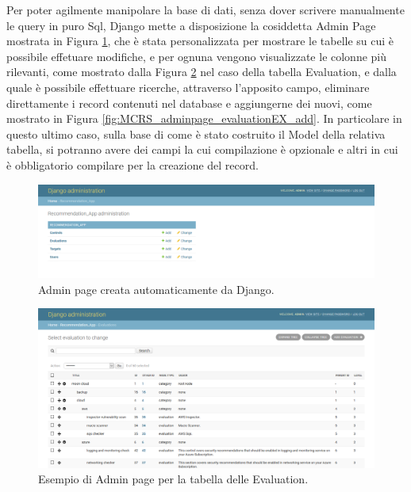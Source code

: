 %
Per poter agilmente manipolare la base di dati, senza dover scrivere manualmente le query in puro Sql, Django mette a disposizione 
la cosiddetta Admin Page mostrata in Figura \ref{fig:MCRS_adminpage}, che è stata personalizzata per mostrare le tabelle su cui è possibile 
effetuare modifiche, e per ognuna vengono visualizzate le colonne più rilevanti, come mostrato dalla 
Figura \ref{fig:MCRS_adminpage_evaluationEX} nel caso della tabella Evaluation, e dalla quale è possibile effettuare ricerche, attraverso 
l'apposito campo, eliminare direttamente i record contenuti nel database e aggiungerne dei nuovi, come mostrato in 
Figura \ref{fig:MCRS_adminpage_evaluationEX_add}.\hfill\break
In particolare in questo ultimo caso, sulla base di come è stato costruito il Model della relativa tabella, si potranno avere dei campi 
la cui compilazione è opzionale e altri in cui è obbligatorio compilare per la creazione del record.
%
\begin{figure}
    \includegraphics[scale=0.3]{images/MCRS_adminpage.png}
    \caption{Admin page creata automaticamente da Django.}
    \label{fig:MCRS_adminpage}
\end{figure}
%
\begin{figure}
    \includegraphics[scale=0.3]{images/MCRS_adminpage_evaluationEX.png}
    \caption{Esempio di Admin page per la tabella delle Evaluation.}
    \label{fig:MCRS_adminpage_evaluationEX}
\end{figure}
%
